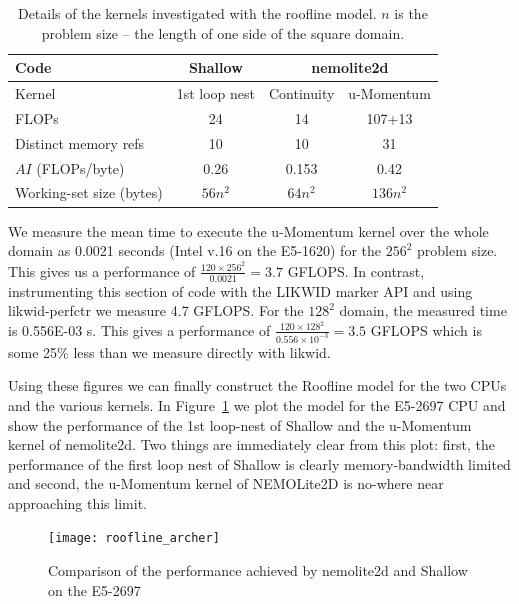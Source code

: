 \documentclass[12pt]{article}
\begin{document}
\begin{table}
\begin{tabular}{|l|c|c|c|}
\hline
Code                       & Shallow & \multicolumn{2}{c|}{nemolite2d} \\
\hline
Kernel                     & 1st loop nest & Continuity & u-Momentum \\
\hline                                
FLOPs                      & 24      &    14      &   107+13   \\
Distinct memory refs       & 10      &    10      &   31       \\
$AI$ (FLOPs/byte)          & 0.26    &  0.153     &   0.42     \\
Working-set size (bytes)   & $56n^2$ &  $64n^2$   &   $136n^2$ \\
\hline
\end{tabular}
\caption{Details of the kernels investigated with the roofline
  model. $n$ is the problem size -- the length of one side of the
  square domain.}
\label{TAB_kernel_details}
\end{table}

We measure the mean time to execute the u-Momentum kernel over the
whole domain as 0.0021 seconds (Intel v.16 on the E5-1620) for the
$256^2$ problem size. This gives us a performance of
$\frac{120\times 256^2}{0.0021} = 3.7$ GFLOPS. In contrast, instrumenting
this section of code with the LIKWID marker API and using
likwid-perfctr we measure 4.7 GFLOPS.
For the $128^2$ domain, the measured time is 0.556E-03 s. This gives a
performance of $\frac{120\times 128^2}{0.556\times10^{-3}} = 3.5$
GFLOPS which is some 25\% less than we measure directly with likwid.

Using these figures we can finally construct the Roofline model for
the two CPUs and the various kernels. In
Figure~\ref{FIG_roofline_archer} we plot the model for the E5-2697 CPU
and show the performance of the 1st loop-nest of Shallow and the
u-Momentum kernel of nemolite2d. Two things are immediately clear from
this plot: first, the performance of the first loop nest of Shallow is
clearly memory-bandwidth limited and second, the u-Momentum kernel of
NEMOLite2D is no-where near approaching this limit.

\begin{figure}
\centering
\texttt{[image: roofline\_archer]}
\caption{Comparison of the performance achieved by nemolite2d and
  Shallow on the E5-2697}
\label{FIG_roofline_archer}
\end{figure}
\end{document}
